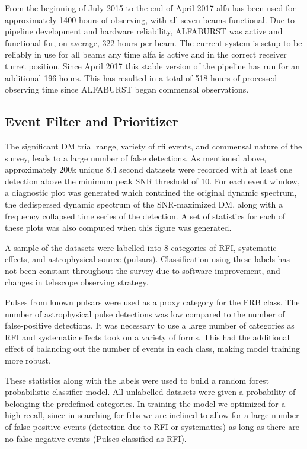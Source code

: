 \documentclass[a4paper,fleqn,usenatbib]{mnras}
\begin{document}
From the beginning of July 2015 to the end of April 2017 \gls{alfa}
has been used for approximately 1400 hours of observing, with all
seven beams functional.  Due to pipeline development and hardware
reliability, ALFABURST was active and functional for, on average, 322
hours per beam.  The current system is setup to be reliably in use for
all beams any time \gls{alfa} is active and in the correct receiver
turret position. Since April 2017 this stable version of the pipeline
has run for an additional 196 hours. This has resulted in a total of
518 hours of processed observing time since ALFABURST began commensal
observations.



\subsection{Event Filter and Prioritizer}
\label{sec:event_classify}


The significant DM trial range, variety of \gls{rfi} events, and
commensal nature of the survey, leads to a large number of false
detections. As mentioned above, approximately 200k unique 8.4 second
datasets were recorded with at least one detection above the minimum
peak SNR threshold of 10. For each event window, a diagnostic plot was
generated which contained the original dynamic spectrum, the
dedispersed dynamic spectrum of the SNR-maximized DM, along with a
frequency collapsed time series of the detection. A set of statistics
for each of these plots was also computed when this figure was
generated.

A sample of the datasets were labelled into 8 categories of RFI,
systematic effects, and astrophysical source (pulsars). Classification
using these labels has not been constant throughout the survey due to
software improvement, and changes in telescope observing strategy.

Pulses from known pulsars were used as a proxy category for the FRB
class. The number of astrophysical pulse detections was low compared
to the number of false-positive detections. It was necessary to use a
large number of categories as RFI and systematic effects took on a
variety of forms.  This had the additional effect of balancing out the
number of events in each class, making model training more robust.

These statistics along with the labels were used to build a random
forest probabilistic classifier model. All unlabelled datasets were
given a probability of belonging the predefined categories. In
training the model we optimized for a high recall, since in searching
for \glspl{frb} we are inclined to allow for a large number of
false-positive events (detection due to RFI or systematics) as long as
there are no false-negative events (Pulses classified as RFI).
\end{document}
